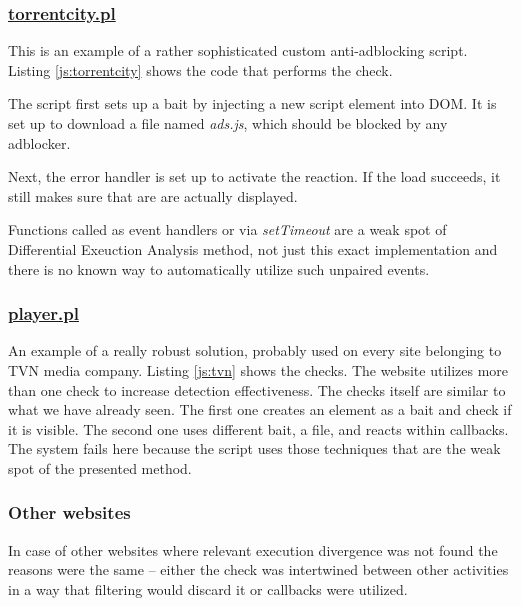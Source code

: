 \subsubsection{\url{torrentcity.pl}}
This is an example of a rather sophisticated custom anti-adblocking script.
Listing \ref{js:torrentcity} shows the code that performs the check.


                       
The script first sets up a bait by injecting a new script element into DOM. It is set up to download
a file named \emph{ads.js}, which should be blocked by any adblocker.

Next, the error handler is set up to activate the reaction. If the load succeeds, it still
makes sure that are are actually displayed.

Functions called as event handlers or via \emph{setTimeout} are a weak spot of 
Differential Exeuction Analysis method, not just this exact implementation 
and there is no known way to automatically utilize such unpaired events.

\subsubsection{\url{player.pl}}
An example of a really robust solution, probably used on every site belonging to TVN media company.
Listing \ref{js:tvn} shows the checks. The website utilizes more than one check
to increase detection effectiveness.
The checks itself are similar to what we have already seen. The first one creates an element as a bait 
and check if it is visible. The second one uses different bait, a file, and reacts within callbacks.
The system fails here because the script uses those techniques 
that are the weak spot of the presented method.



\subsubsection{Other websites}
In case of other websites where relevant execution divergence was not found 
the reasons were the same -- either the check was intertwined between other activities
in a way that filtering would discard it or callbacks were utilized.


